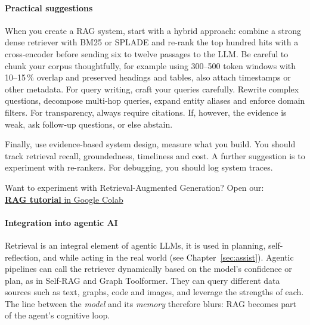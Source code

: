 \paragraph{Practical suggestions}  %
When you create a RAG system, start with a hybrid approach: combine a strong dense retriever with BM25 or SPLADE and re-rank the top hundred hits with a cross‑encoder before sending six to twelve passages to the LLM.  Be careful to chunk your corpus thoughtfully, for example using 300–500 token windows with 10–15\,\% overlap and preserved headings and tables, also attach timestamps or other metadata.  For query writing, craft your queries carefully. Rewrite complex questions, decompose multi‑hop queries, expand entity aliases and enforce domain filters.  For transparency, always require citations. If, however, the evidence is weak, ask follow‑up questions, or else abstain.  

Finally, use  evidence-based system design, measure what you build. You should  track retrieval recall, groundedness, timeliness and cost. A further suggestion is to experiment with re-rankers. For debugging, you should log system traces. 



\begin{tcolorbox}[
    colback=blue!10!white,
    colframe=blue!85!black,
    title={\faRocket\quad Try it yourself!},
    fonttitle=\bfseries,
    coltitle=white,
    boxrule=1pt,
    arc=4pt,
    left=5pt,
    right=5pt,
    top=5pt,
    bottom=5pt,
    enhanced
]
Want to experiment with Retrieval-Augmented Generation?  
Open our:\\ 
\href{https://colab.research.google.com/github/Agentic-LLMs/Agentic-AI-tutorials/blob/main/rag_tutorial.ipynb}{\faCode\quad \textbf{RAG tutorial} in Google Colab}
\end{tcolorbox}

\paragraph{Integration into agentic AI}  Retrieval is %
an integral element of agentic LLMs, it is used in  planning, self-reflection, and while acting in the real world (see Chapter~\ref{sec:assist}). Agentic pipelines can call the retriever dynamically based on the model’s confidence or plan, as in Self‑RAG and Graph Toolformer.  They can query different data sources such as text, graphs, code and images, and leverage the strengths of each.  The line between the {\em model} and its {\em memory} therefore blurs: RAG becomes part of the agent’s cognitive loop.

